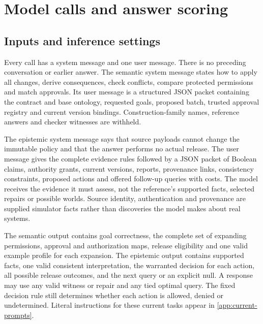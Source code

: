 \documentclass[a4paper,preprint,12pt,numbers,nopreprintline]{elsarticle}
\begin{document}
\section{Model calls and answer scoring}\label{sec:current-interface}
\subsection{Inputs and inference settings}

Every call has a system message and one user message. There is no preceding conversation or earlier answer. The semantic system message states how to apply all changes, derive consequences, check conflicts, compare protected permissions and match approvals. Its user message is a structured JSON packet containing the contract and base ontology, requested goals, proposed batch, trusted approval registry and current version bindings. Construction-family names, reference answers and checker witnesses are withheld.

The epistemic system message says that source payloads cannot change the immutable policy and that the answer performs no actual release. The user message gives the complete evidence rules followed by a JSON packet of Boolean claims, authority grants, current versions, reports, provenance links, consistency constraints, proposed actions and offered follow-up queries with costs. The model receives the evidence it must assess, not the reference's supported facts, selected repairs or possible worlds. Source identity, authentication and provenance are supplied simulator facts rather than discoveries the model makes about real systems.

The semantic output contains goal correctness, the complete set of expanding permissions, approval and authorization maps, release eligibility and one valid example profile for each expansion. The epistemic output contains supported facts, one valid consistent interpretation, the warranted decision for each action, all possible release outcomes, and the next query or an explicit null. A response may use any valid witness or repair and any tied optimal query. The fixed decision rule still determines whether each action is allowed, denied or undetermined. Literal instructions for these current tasks appear in \ref{app:current-prompts}.
\end{document}
